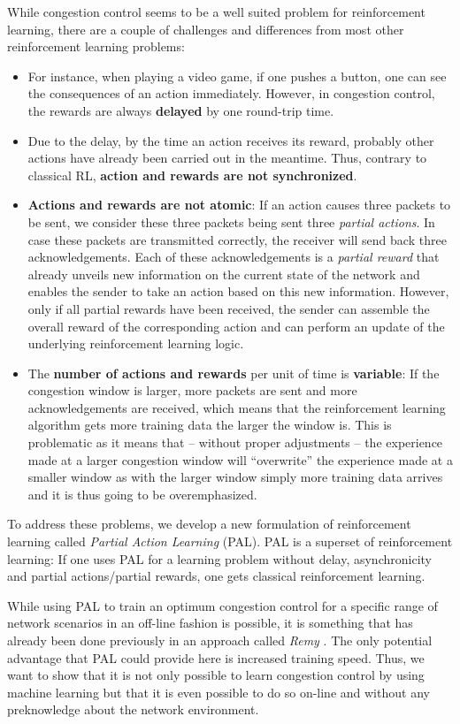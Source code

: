\documentclass[sigconf]{acmart}
\begin{document}
While congestion control seems to be a well suited problem for reinforcement learning, there are a couple of challenges and differences from most other reinforcement learning problems:  \begin{itemize}
\item For instance, when playing a video game, if one pushes a button, one can see the consequences of an action immediately. However, in congestion control, the rewards are always \textbf{delayed} by one round-trip time.
\item Due to the delay, by the time an action receives its reward, probably other actions have already been carried out in the meantime. Thus, contrary to classical RL, \textbf{action and rewards are not synchronized}. 
\item \textbf{Actions and rewards are not atomic}: If an action causes three packets to be sent, we consider these three packets being sent three \textit{partial actions}. In case these packets are transmitted correctly, the receiver will send back three acknowledgements. Each of these acknowledgements is a \textit{partial reward} that already unveils new information on the current state of the network and enables the sender to take an action based on this new information. However, only if all partial rewards have been received, the sender can assemble the overall reward of the corresponding action and can perform an update of the underlying reinforcement learning logic. 
\item The \textbf{number of actions and rewards} per unit of time is \textbf{variable}: If the congestion window is larger, more packets are sent and more acknowledgements are received, which means that the reinforcement learning algorithm gets more training data the larger the window is. This is problematic as it means that -- without proper adjustments -- the experience made at a larger congestion window will ``overwrite'' the experience made at a smaller window as with the larger window simply more training data arrives and it is thus going to be overemphasized. 
\end{itemize}

To address these problems, we develop a new formulation of reinforcement learning called \textit{Partial Action Learning} (PAL). PAL is a superset of reinforcement learning: If one uses PAL for a learning problem without delay, asynchronicity and partial actions/partial rewards, one gets classical reinforcement learning.

While using PAL to train an optimum congestion control for a specific range of network scenarios in an off-line fashion is possible, it is something that has already been done previously in an approach called \textit{Remy} \citep{winstein_tcp_2013}. The only potential advantage that PAL could provide here is increased training speed. Thus, we want to show that it is  not only possible to learn congestion control by using machine learning but that it is even possible to do so on-line and without any preknowledge about the network environment.
\end{document}
